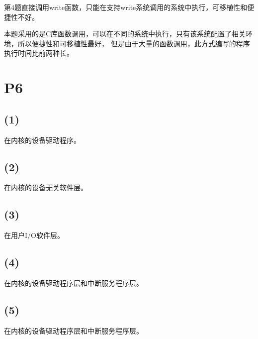 \documentclass{article}
\begin{document}
第4题直接调用write函数，只能在支持write系统调用的系统中执行，可移植性和便捷性不好。

本题采用的是C库函数调用，可以在不同的系统中执行，只有该系统配置了相关环境，所以便捷性和可移植性最好，
但是由于大量的函数调用，此方式编写的程序执行时间比前两种长。
\section*{P6}
\subsection*{(1)}
在内核的设备驱动程序。
\subsection*{(2)}
在内核的设备无关软件层。
\subsection*{(3)}
在用户I/O软件层。
\subsection*{(4)}
在内核的设备驱动程序层和中断服务程序层。
\subsection*{(5)}
在内核的设备驱动程序层和中断服务程序层。
\end{document}
